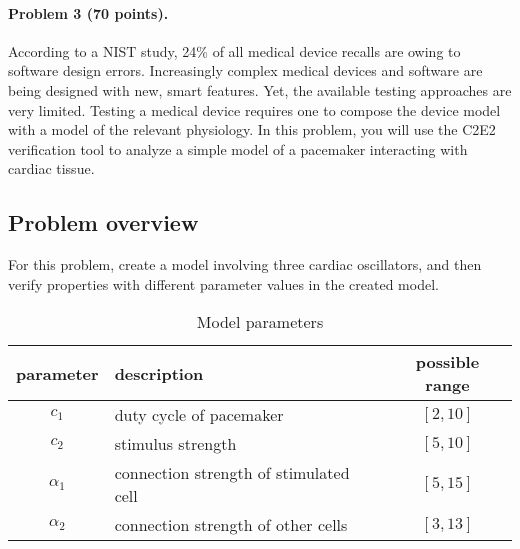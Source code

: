 \documentclass[11pt]{article}
\begin{document}
\paragraph{Problem 3 (70 points).}
According to a NIST study, 24\% of all medical device recalls are owing to software design errors. Increasingly complex medical devices and software are being designed with new, smart features. Yet, the available testing approaches are very limited. Testing a medical device requires one to compose the device model with a model of the relevant physiology. In this problem, you will use the C2E2 verification tool to analyze a simple model of a pacemaker interacting with cardiac tissue. 


\subsection{Problem overview}

For this problem, create a model involving three cardiac oscillators, and then verify properties with different parameter values in the created model.

\begin{table}[h]
	\small
	\centering
	\caption{Model parameters}   
	\begin{tabular}{|c | l | c |}
		\hline
		parameter & description & possible range \\
		\hline
		$c_1$ & duty cycle of pacemaker & $[2,10]$ \\
		$c_2$ & stimulus strength  & $[5,10]$ \\
		$\alpha_1$ & connection strength of stimulated cell & $[5,15]$ \\
		$\alpha_2$ & connection strength of other cells & $[3,13]$ \\
		\hline
	\end{tabular}%
	\label{tab:parameters}%
\end{table}%
\end{document}
